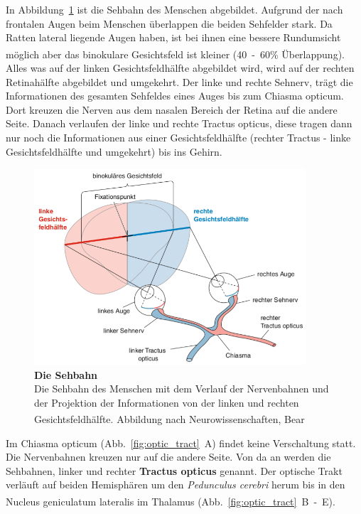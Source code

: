 \documentclass[12pt,a4paper,pdftex]{article}
\begin{document}
In Abbildung~\ref{fig:sehbahn_baer} ist die Sehbahn des Menschen abgebildet. Aufgrund der nach frontalen Augen beim Menschen überlappen die beiden Sehfelder stark. Da Ratten lateral liegende Augen haben, ist bei ihnen eine bessere Rundumsicht möglich aber das binokulare Gesichtsfeld ist kleiner (40~-~60\% Überlappung). \textsuperscript{\cite[30]{paxinos2014rat}}
Alles was auf der linken Gesichtsfeldhälfte abgebildet wird, wird auf der rechten Retinahälfte abgebildet und umgekehrt. Der linke und rechte Sehnerv, trägt die Informationen des gesamten Sehfeldes eines Auges bis zum Chiasma opticum. Dort kreuzen die Nerven aus dem nasalen Bereich der Retina auf die andere Seite. Danach verlaufen der linke und rechte Tractus opticus,  diese tragen dann nur noch die Informationen aus einer Gesichtsfeldhälfte (rechter Tractus - linke Gesichtsfeldhälfte und umgekehrt) bis ins Gehirn.


\begin{figure}[H]
    \centering
    \includegraphics[width = 0.9\textwidth]{pictures/visual/Sehbahn.png}
    \caption[Die Sehbahn]{\textbf{Die Sehbahn}\\
    Die Sehbahn des Menschen mit dem Verlauf der Nervenbahnen und der Projektion der Informationen von der linken und rechten Gesichtsfeldhälfte.
    Abbildung nach Neurowissenschaften, Bear \textsuperscript{\cite[10]{neurowissenschaften_baer}}}
    \label{fig:sehbahn_baer}
\end{figure}

Im Chiasma opticum (Abb.~\ref{fig:optic_tract}~A) findet keine Verschaltung statt. Die Nervenbahnen kreuzen nur auf die andere Seite. Von da an werden die Sehbahnen, linker und rechter \textbf{Tractus opticus}  genannt. Der optische Trakt verläuft auf beiden Hemisphären um den \textit{Pedunculus cerebri} herum bis in den Nucleus geniculatum lateralis im Thalamus (Abb.~\ref{fig:optic_tract}~B~-~E). \textsuperscript{\cite[15]{crossman2014neuroanatomy}}
\end{document}
